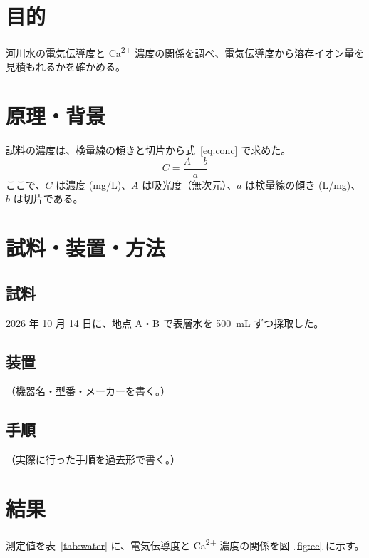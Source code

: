 \documentclass[lualatex, paper=a4paper, fontsize=10.5pt, jafontsize=10.5pt,
  baselineskip=19.5pt, line_length=160mm, head_space=25mm, foot_space=25mm]{jlreq}
\begin{document}


\section{目的}
河川水の電気伝導度と Ca\textsuperscript{2+} 濃度の関係を調べ、電気伝導度から溶存イオン量を見積もれるかを確かめる。

\section{原理・背景}
試料の濃度は、検量線の傾きと切片から式~\eqref{eq:conc} で求めた。
\begin{equation}
  C = \frac{A - b}{a} \label{eq:conc}
\end{equation}
ここで、$C$ は濃度 (\si{mg/L})、$A$ は吸光度（無次元）、$a$ は検量線の傾き (\si{L/mg})、$b$ は切片である。


\section{試料・装置・方法}
\subsection{試料}
2026 年 10 月 14 日に、地点 A・B で表層水を \qty{500}{mL} ずつ採取した。
\subsection{装置}
（機器名・型番・メーカーを書く。）
\subsection{手順}
（実際に行った手順を過去形で書く。）

\section{結果}
測定値を表~\ref{tab:water} に、電気伝導度と Ca\textsuperscript{2+} 濃度の関係を図~\ref{fig:ec} に示す。
\end{document}
